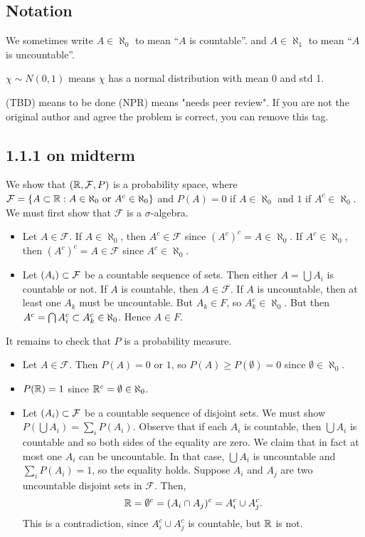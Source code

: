 \documentclass[11pt]{article}
\begin{document}
\subsection*{Notation}

We sometimes write $A \in \aleph_0$ to mean ``$A$ is countable''. and $A \in \aleph_1$ to mean ``$A$ is uncountable''. 

$\chi \sim N(0,1)$ means $\chi$ has a normal distribution with mean 0 and std 1.

(TBD) means to be done
(NPR) means "needs peer review". If you are not the original author and agree the problem is correct, you can remove this tag.

\subsection*{1.1.1 on midterm}

We show that $({\mathbb R}, \mathcal{F}, P)$ is a probability space, where $\mathcal{F} = \{A \subset {\mathbb R} : A \in \aleph_0 \text{ or } A^c \in \aleph_0\}$ and $P(A) = 0$ if $A \in \aleph_0$ and $1$ if $A^c \in \aleph_0$. We must first show that $\mathcal{F}$ is a $\sigma$-algebra. 

\begin{itemize}
    \item Let $A \in \mathcal{F}$. If $A \in \aleph_0$, then $A^c \in \mathcal{F}$ since $(A^c)^c = A \in \aleph_0$. If $A^c \in \aleph_0$, then $(A^c)^c = A \in \mathcal{F}$ since $A^c \in \aleph_0$.
    \item Let $(A_i) \subset \mathcal{F}$ be a countable sequence of sets. Then either $A = \bigcup A_i$ is countable or not. If $A$ is countable, then $A \in \mathcal{F}$. If $A$ is uncountable, then at least one $A_k$ must be uncountable. But $A_k \in F$, so $A_k^c \in \aleph_0$. But then $A^c = \bigcap A_i^c \subset A_k^c \in \aleph_0$. Hence $A \in F$.
\end{itemize} 

It remains to check that $P$ is a probability measure. 

\begin{itemize}
    \item Let $A \in \mathcal{F}$. Then $P(A) = 0$ or $1$, so $P(A) \geq P(\emptyset) = 0$ since $\emptyset \in \aleph_0$.
    \item $P({\mathbb R}) = 1$ since ${\mathbb R}^c = \emptyset \in \aleph_0$.
    \item Let $(A_i) \subset \mathcal{F}$ be a countable sequence of disjoint sets. We must show $P(\bigcup A_i) = \sum_i P(A_i)$. Observe that if each $A_i$ is countable, then $\bigcup A_i$ is countable and so both sides of the equality are zero. We claim that in fact at most one $A_i$ can be uncountable. In that case, $\bigcup A_i$ is uncountable and $\sum_i P(A_i) = 1$, so the equality holds. Suppose $A_i$ and $A_j$ are two uncountable disjoint sets in $\mathcal{F}$. Then, \[{\mathbb R} = \emptyset^c = (A_i \cap A_j)^c = A_i^c \cup A_j^c.\] This is a contradiction, since $A_i^c \cup A_j^c$ is countable, but ${\mathbb R}$ is not. 
\end{itemize}
\end{document}
